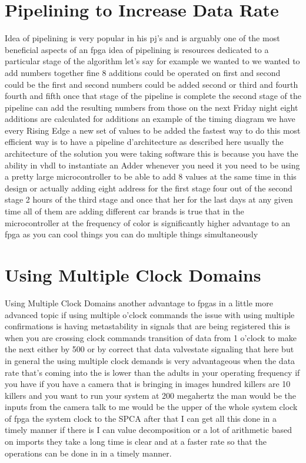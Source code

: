 \section{Pipelining to Increase Data Rate}
Idea of pipelining is very popular in his pj's and is arguably one of the most beneficial aspects of an fpga idea of pipelining is resources dedicated to a particular stage of the algorithm let's say for example we wanted to we wanted to add numbers together fine 8 additions could be operated on first and second could be the first and second numbers could be added second or third and fourth fourth and fifth once that stage of the pipeline is complete the second stage of the pipeline can add the resulting numbers from those on the next Friday night eight additions are calculated for additions an example of the timing diagram we have every Rising Edge a new set of values to be added the fastest way to do this most efficient way is to have a pipeline d'architecture as described here usually the architecture of the solution you were taking software this is because you have the ability in vhdl to instantiate an Adder whenever you need it you need to be using a pretty large microcontroller to be able to add 8 values at the same time in this design or actually adding eight address for the first stage four out of the second stage 2 hours of the third stage and once that her for the last days at any given time all of them are adding different car brands is true that in the microcontroller at the frequency of color is significantly higher advantage to an fpga as you can cool things you can do multiple things simultaneously

\section{Using Multiple Clock Domains}
Using Multiple Clock Domains another advantage to fpgas in a little more advanced topic if using multiple o'clock commands the issue with using multiple confirmations is having metastability in signals that are being registered this is when you are crossing clock commands transition of data from 1 o'clock to make the next either by 500 or by correct that data valvestate signaling that here but in general the using multiple clock demands is very advantageous when the data rate that's coming into the is lower than the adults in your operating frequency if you have if you have a camera that is bringing in images hundred killers are 10 killers and you want to run your system at 200 megahertz the man would be the inputs from the camera talk to me would be the upper of the whole system clock of fpga the system clock to the SPCA after that I can get all this done in a timely manner if there is I can value decomposition or a lot of arithmetic based on imports they take a long time is clear and at a faster rate so that the operations can be done in in a timely manner.